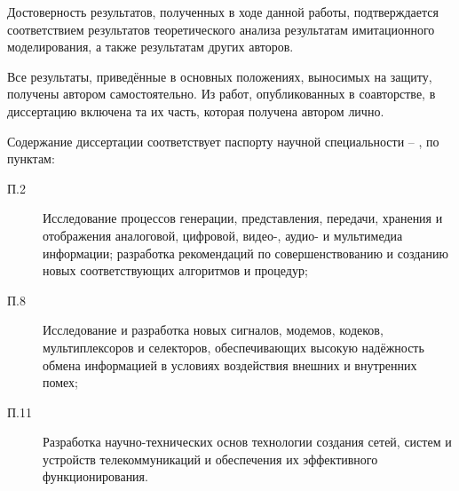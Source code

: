 {\reliability} Достоверность результатов, полученных в ходе данной работы, подтверждается соответствием результатов теоретического анализа  результатам имитационного моделирования, а также результатам других авторов.

{\probation}

{\contribution} Все результаты, приведённые в основных положениях, выносимых на защиту, получены автором самостоятельно. Из работ, опубликованных в соавторстве, в диссертацию включена та их часть, которая получена автором лично.

{\passconf} Содержание диссертации соответствует паспорту научной специальности \thesisSpecialtyTwoNumber – \thesisSpecialtyTwoTitle, по пунктам:
\begin{description}
	\item[П.2] Исследование процессов генерации, представления, передачи, хранения и отображения аналоговой, цифровой, видео-, аудио- и мультимедиа информации; разработка рекомендаций по совершенствованию и созданию новых соответствующих алгоритмов и процедур;
	\item[П.8] Исследование и разработка новых сигналов, модемов, кодеков, мультиплексоров и селекторов, обеспечивающих высокую надёжность обмена информацией в условиях воздействия внешних и внутренних помех;
	\item[П.11] Разработка научно-технических основ технологии создания сетей, систем и устройств телекоммуникаций и обеспечения их эффективного функционирования.
\end{description}


